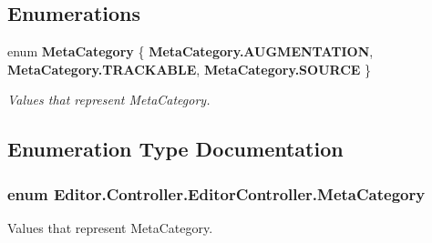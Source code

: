 \subsection*{Enumerations}
\begin{DoxyCompactItemize}
\item 
enum {\bf Meta\-Category} \{ {\bf Meta\-Category.\-A\-U\-G\-M\-E\-N\-T\-A\-T\-I\-O\-N}, 
{\bf Meta\-Category.\-T\-R\-A\-C\-K\-A\-B\-L\-E}, 
{\bf Meta\-Category.\-S\-O\-U\-R\-C\-E}
 \}
\begin{DoxyCompactList}\small\item\em Values that represent Meta\-Category. \end{DoxyCompactList}\end{DoxyCompactItemize}


\subsection{Enumeration Type Documentation}
\subsubsection[{Meta\-Category}]{\setlength{\rightskip}{0pt plus 5cm}enum {\bf Editor.\-Controller.\-Editor\-Controller.\-Meta\-Category}}\label{namespace_editor_1_1_controller_1_1_editor_controller_ad8726486dd7c43c96d76f71074a7c275}


Values that represent Meta\-Category. 

